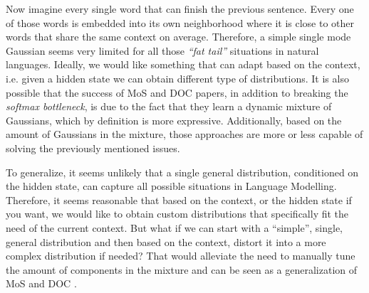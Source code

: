 Now imagine every single word that can finish the previous sentence. Every one of those words is embedded into its own neighborhood where it is close to other words that share the same context on average. Therefore, a simple single mode Gaussian seems very limited for all those \emph{``fat tail''} situations in natural languages. Ideally, we would like something that can adapt based on the context, i.e. given a hidden state we can obtain different type of distributions. It is also possible that the success of MoS \citep{yang2017breaking} and DOC \citep{takase2018direct} papers, in addition to breaking the \emph{softmax bottleneck}, is due to the fact that they learn a dynamic mixture of Gaussians, which by definition is more expressive. Additionally, based on the amount of Gaussians in the mixture, those approaches are more or less capable of solving the previously mentioned issues.

To generalize, it seems unlikely that a single general distribution, conditioned on the hidden state, can capture all possible situations in Language Modelling. Therefore, it seems reasonable that based on the context, or the hidden state if you want, we would like to obtain custom distributions that specifically fit the need of the current context. But what if we can start with a ``simple'', single, general distribution and then based on the context, distort it into a more complex distribution if needed? That would alleviate the need to manually tune the amount of components in the mixture and can be seen as a generalization of MoS \citep{yang2017breaking} and DOC \citep{takase2018direct}.
